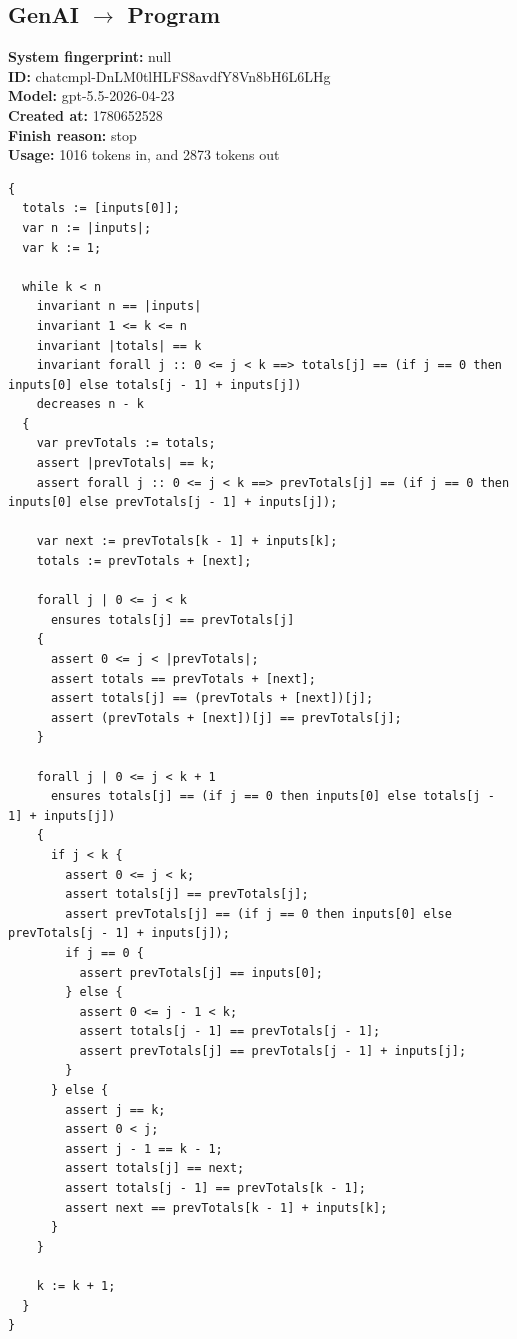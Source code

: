 \documentclass{article}
\begin{document}
\subsection*{GenAI $\rightarrow$ Program}
\textbf{System fingerprint: }null
\\\textbf{ID: }chatcmpl-DnLM0tlHLFS8avdfY8Vn8bH6L6LHg
\\\textbf{Model: }gpt-5.5-2026-04-23
\\\textbf{Created at: }1780652528
\\\textbf{Finish reason: }stop
\\\textbf{Usage: }1016 tokens in, and 2873 tokens out
\begin{lstlisting}
{
  totals := [inputs[0]];
  var n := |inputs|;
  var k := 1;

  while k < n
    invariant n == |inputs|
    invariant 1 <= k <= n
    invariant |totals| == k
    invariant forall j :: 0 <= j < k ==> totals[j] == (if j == 0 then inputs[0] else totals[j - 1] + inputs[j])
    decreases n - k
  {
    var prevTotals := totals;
    assert |prevTotals| == k;
    assert forall j :: 0 <= j < k ==> prevTotals[j] == (if j == 0 then inputs[0] else prevTotals[j - 1] + inputs[j]);

    var next := prevTotals[k - 1] + inputs[k];
    totals := prevTotals + [next];

    forall j | 0 <= j < k
      ensures totals[j] == prevTotals[j]
    {
      assert 0 <= j < |prevTotals|;
      assert totals == prevTotals + [next];
      assert totals[j] == (prevTotals + [next])[j];
      assert (prevTotals + [next])[j] == prevTotals[j];
    }

    forall j | 0 <= j < k + 1
      ensures totals[j] == (if j == 0 then inputs[0] else totals[j - 1] + inputs[j])
    {
      if j < k {
        assert 0 <= j < k;
        assert totals[j] == prevTotals[j];
        assert prevTotals[j] == (if j == 0 then inputs[0] else prevTotals[j - 1] + inputs[j]);
        if j == 0 {
          assert prevTotals[j] == inputs[0];
        } else {
          assert 0 <= j - 1 < k;
          assert totals[j - 1] == prevTotals[j - 1];
          assert prevTotals[j] == prevTotals[j - 1] + inputs[j];
        }
      } else {
        assert j == k;
        assert 0 < j;
        assert j - 1 == k - 1;
        assert totals[j] == next;
        assert totals[j - 1] == prevTotals[k - 1];
        assert next == prevTotals[k - 1] + inputs[k];
      }
    }

    k := k + 1;
  }
}
\end{lstlisting}
\end{document}
